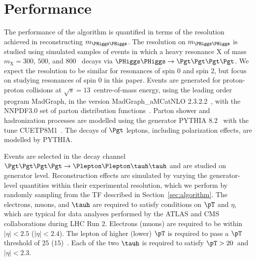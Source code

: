 \section{Performance}
\label{sec:performance}

The performance of the algorithm is quantified in terms of the resolution achieved in reconstructing $m_{\PHiggs\PHiggs}$.
The resolution on $m_{\PHiggs\PHiggs}$ is studied using simulated samples of events
in which a heavy resonance $\textrm{X}$ of mass $m_{\textrm{X}} = 300$, $500$, and $800$~\GeV
decays via $\PHiggs\PHiggs \to \Pgt\Pgt\Pgt\Pgt$.
We expect the resolution to be similar for resonances of spin $0$ and spin $2$,
but focus on studying resonances of spin $0$ in this paper.
Events are generated for proton-proton collisions at $\sqrt{s} = 13$~\TeV centre-of-mass energy,
using the leading order program MadGraph, in the version MadGraph\_aMCatNLO 2.3.2.2~\cite{MadGraph_aMCatNLO},
with the NNPDF3.0 set of parton distribution functions~\cite{NNPDF1,NNPDF2,NNPDF3}.
Parton shower and hadronization processes are modelled using the generator PYTHIA 8.2~\cite{pythia8} with the tune CUETP8M1~\cite{PYTHIA_CUETP8M1tune_CMS}.
The decays of $\Pgt$ leptons, including polarization effects, are modelled by PYTHIA.

Events are selected in the decay channel $\Pgt\Pgt\Pgt\Pgt \to \Plepton\Plepton\tauh\tauh$
and are studied on generator level.
Reconstruction effects are simulated by varying the generator-level quantities within their experimental resolution,
which we perform by randomly sampling from the TF described in Section~\ref{sec:algorithm}.
The electrons, muons, and $\tauh$ are required to satisfy conditions on $\pT$ and $\eta$, 
which are typical for data analyses performed by the ATLAS and CMS collaborations during LHC Run $2$.
Electrons (muons) are required to be within $\vert\eta\vert < 2.5$ ($\vert\eta\vert < 2.4$).
The lepton of higher (lower) $\pT$ is required to pass a $\pT$ threshold of $25$ ($15$)~\GeV.
Each of the two $\tauh$ is required to satisfy $\pT > 20$~\GeV and $\vert\eta\vert < 2.3$.

